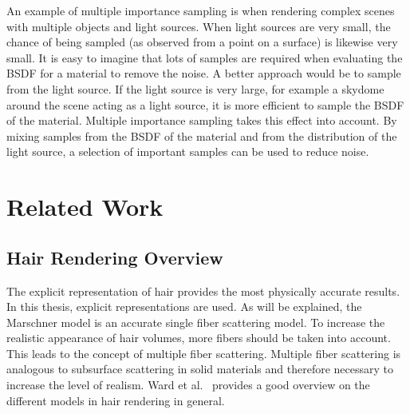 \documentclass[11pt,a4paper]{report}
\begin{document}
An example of multiple importance sampling is when rendering complex scenes with multiple objects and light sources. When light sources are very small, the chance of being sampled (as observed from a point on a surface) is likewise very small. It is easy to imagine that lots of samples are required when evaluating the BSDF for a material to remove the noise. A better approach would be to sample from the light source. If the light source is very large, for example a skydome around the scene acting as a light source, it is more efficient to sample the BSDF of the material. Multiple importance sampling takes this effect into account. By mixing samples from the BSDF of the material and from the distribution of the light source, a selection of important samples can be used to reduce noise. 





\chapter{Related Work}






\section{Hair Rendering Overview}

The explicit representation of hair provides the most physically accurate results. In this thesis, explicit representations are used. As will be explained, the Marschner model is an accurate single fiber scattering model. To increase the realistic appearance of hair volumes, more fibers should be taken into account. This leads to the concept of multiple fiber scattering. Multiple fiber scattering is analogous to subsurface scattering in solid materials and therefore necessary to increase the level of realism. Ward et al.~\cite{ward} provides a good overview on the different models in hair rendering in general.
\end{document}
